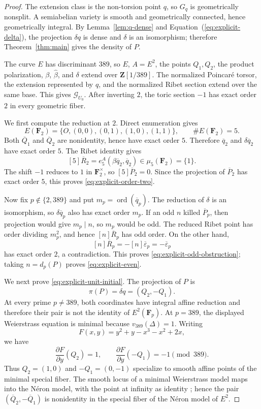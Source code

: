 \documentclass[11pt,letterpaper,reqno]{amsart}
\theoremstyle{definition}
\theoremstyle{remark}
\newcommand{\Z}{\mathbf Z}
\newcommand{\F}{\mathbf F}
\newcommand{\ord}{\operatorname{ord}}
\newcommand{\eps}{\varepsilon}
\begin{document}
\begin{proof}
The extension class is the non-torsion point $q$, so $G_q$ is geometrically
nonsplit.  A semiabelian variety is smooth and geometrically connected, hence
geometrically integral.  By Lemma~\ref{lem:q-dense} and Equation~(\ref{eq:explicit-delta}), the
projection $\delta q$ is dense and $\delta$ is an isomorphism; therefore
Theorem~\ref{thm:main} gives the density of $P$.

The curve $E$ has discriminant $389$, so $E$, $A=E^2$, the points
$Q_1,Q_2$, the product polarization, $\beta$, $\widehat\beta$, and $\delta$
extend over $\Z[1/389]$.  The normalized Poincar\'e torsor, the extension
represented by $q$, and the normalized Ribet section extend over the same
base.  This gives $\mathcal G_{U_0}$.  After inverting $2$, the toric section
$-1$ has exact order $2$ in every geometric fiber.

We first compute the reduction at $2$.  Direct enumeration gives
\[
 E(\F_2)=\{O,(0,0),(0,1),(1,0),(1,1)\},
 \qquad \#E(\F_2)=5.
\]
Both $\overline Q_1$ and $\overline Q_2$ are nonidentity, hence have exact
order $5$.  Therefore $\overline q_2$ and
$\delta\overline q_2$ have exact order $5$.  The Ribet identity gives
\[
 [5]\overline R_2
 =e_5^A(\beta\overline q_2,\overline q_2)
 \in\mu_5(\F_2)=\{1\}.
\]
The shift $-1$ reduces to $1$ in $\F_2^\times$, so
$[5]\overline P_2=0$.  Since the projection of $\overline P_2$ has exact
order $5$, this proves \eqref{eq:explicit-order-two}.

Now fix $p\notin\{2,389\}$ and put
$m_p=\ord(\overline q_p)$.  The reduction of $\delta$ is an isomorphism, so
$\delta\overline q_p$ also has exact order $m_p$.  If an odd $n$ killed
$\overline P_p$, then projection would give $m_p\mid n$, so $m_p$ would be
odd.  The reduced Ribet point has order dividing $m_p^2$, and hence
$[n]\overline R_p$ has odd order.  On the other hand,
\[
 [n]\overline R_p=-[n]\overline\eps_p=-\overline\eps_p
\]
has exact order $2$, a contradiction.  This proves
\eqref{eq:explicit-odd-obstruction}; taking $n=d_p(P)$ proves
\eqref{eq:explicit-even}.

We next prove \eqref{eq:explicit-unit-initial}.  The projection of $P$ is
\[
 \pi(P)=\delta q=(Q_2,-Q_1).
\]
At every prime $p\ne389$, both coordinates have integral affine reduction and
therefore their pair is not the identity of $E^2(\F_p)$.  At $p=389$, the
displayed Weierstrass equation is minimal because $v_{389}(\Delta)=1$.
Writing
\[
 F(x,y)=y^2+y-x^3-x^2+2x,
\]
we have
\[
 \frac{\partial F}{\partial y}(Q_2)=1,
 \qquad
 \frac{\partial F}{\partial y}(-Q_1)=-1
 \pmod{389}.
\]
Thus $Q_2=(1,0)$ and $-Q_1=(0,-1)$ specialize to smooth affine points of the
minimal special fiber.  The smooth locus of a minimal Weierstrass model maps
into the N\'eron model, with the point at infinity as identity
\cite[Chapter~VII, \S2]{SilvermanAEC}; hence the pair
$(\overline Q_2,-\overline Q_1)$ is nonidentity in the special fiber of the
N\'eron model of $E^2$.


\end{proof}
\end{document}
